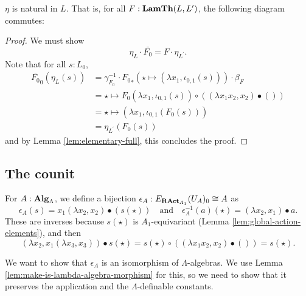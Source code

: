 \begin{lemma}
  $ \eta $ is natural in $ L $. That is, for all $ F: \mathbf{LamTh}(L, L^\prime) $, the following diagram commutes:
  \begin{center}
  \end{center}
\end{lemma}
\begin{proof}
  We must show
  \[ \eta_L \cdot \bar{F_0} = F \cdot \eta_{L^\prime}. \]
  Note that for all $ s : L_0 $,
  \begin{align*}
    \bar{F_0}_0(\eta_L(s))
    &= \gamma_{F_0}^{-1} \cdot {F_0}_*(\star \mapsto (\lambda x_1, \iota_{0, 1}(s))) \cdot \beta_F\\
    &= \star \mapsto F_0(\lambda x_1, \iota_{0, 1}(s)) \circ ((\lambda x_1 x_2, x_2) \bullet ())\\
    &= \star \mapsto (\lambda x_1, \iota_{0, 1}(F_0(s)))\\
    &= \eta_{L^\prime}(F_0(s))
  \end{align*}
  and by Lemma \ref{lem:elementary-full}, this concludes the proof.
\end{proof}

\subsection{The counit}

\begin{definition}
  For $ A : \mathbf{Alg}_{\Lambda} $, we define a bijection $ \epsilon_A : E_{\mathbf{RAct}_{A_1}}(U_A)_0 \cong A $ as
  \[ \epsilon_A(s) = x_1 (\lambda x_2, x_2) \bullet (s(\star)) \quad \text{and} \quad \epsilon_A^{-1}(a)(\star) = (\lambda x_2, x_1) \bullet a. \]
  These are inverses because $ s(\star) $ is $ A_1 $-equivariant (Lemma \ref{lem:global-action-elements}), and then
  \[ (\lambda x_2, x_1 (\lambda x_3, x_3)) \bullet s(\star) = s(\star) \circ ((\lambda x_1 x_2, x_2) \bullet ()) = s(\star). \]
\end{definition}

We want to show that $ \epsilon_A $ is an isomorphism of $ \Lambda $-algebras. We use Lemma \ref{lem:make-is-lambda-algebra-morphism} for this, so we need to show that it preserves the application and the $ \Lambda $-definable constants.

